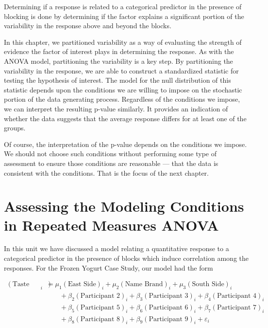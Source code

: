 \documentclass[
  letterpaper,
  DIV=11,
  numbers=noendperiod]{scrreprt}
\theoremstyle{definition}
\theoremstyle{definition}
\theoremstyle{plain}
\theoremstyle{remark}
\begin{document}
\begin{tcolorbox}[enhanced jigsaw, colbacktitle=quarto-callout-tip-color!10!white, colback=white, left=2mm, title=\textcolor{quarto-callout-tip-color}{\faLightbulb}\hspace{0.5em}{Big Idea}, toptitle=1mm, leftrule=.75mm, breakable, bottomrule=.15mm, arc=.35mm, rightrule=.15mm, toprule=.15mm, coltitle=black, opacityback=0, colframe=quarto-callout-tip-color-frame, opacitybacktitle=0.6, bottomtitle=1mm, titlerule=0mm]

Determining if a response is related to a categorical predictor in the
presence of blocking is done by determining if the factor explains a
significant portion of the variability in the response above and beyond
the blocks.

\end{tcolorbox}

In this chapter, we partitioned variability as a way of evaluating the
strength of evidence the factor of interest plays in determining the
response. As with the ANOVA model, partitioning the variability is a key
step. By partitioning the variability in the response, we are able to
construct a standardized statistic for testing the hypothesis of
interest. The model for the null distribution of this statistic depends
upon the conditions we are willing to impose on the stochastic portion
of the data generating process. Regardless of the conditions we impose,
we can interpret the resulting p-value similarly. It provides an
indication of whether the data suggests that the average response
differs for at least one of the groups.

Of course, the interpretation of the p-value depends on the conditions
we impose. We should not choose such conditions without performing some
type of assessment to ensure those conditions are reasonable --- that
the data is consistent with the conditions. That is the focus of the
next chapter.

\chapter{Assessing the Modeling Conditions in Repeated Measures
ANOVA}\label{sec-blockassessment}

In this unit we have discussed a model relating a quantitative response
to a categorical predictor in the presence of blocks which induce
correlation among the responses. For the Frozen Yogurt Case Study, our
model had the form

\[
\begin{aligned}
  (\text{Taste Rating})_i &= \mu_1 (\text{East Side})_i + \mu_2 (\text{Name Brand})_i + \mu_3 (\text{South Side})_i \\
    &\qquad + \beta_2 (\text{Participant 2})_i + \beta_3 (\text{Participant 3})_i + \beta_4 (\text{Participant 4})_i \\
    &\qquad + \beta_5 (\text{Participant 5})_i + \beta_6 (\text{Participant 6})_i + \beta_7 (\text{Participant 7})_i \\
    &\qquad + \beta_8 (\text{Participant 8})_i + \beta_9 (\text{Participant 9})_i + \varepsilon_i
\end{aligned}
\]
\end{document}

